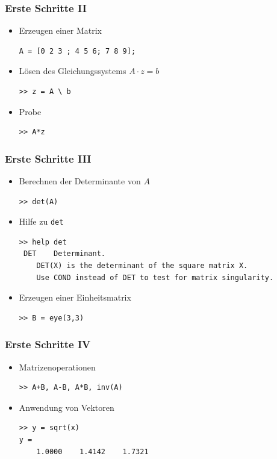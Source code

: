 \begin{frame}[fragile]\frametitle{Erste Schritte II}
\begin{itemize}
\item Erzeugen einer Matrix
\begin{lstlisting}
A = [0 2 3 ; 4 5 6; 7 8 9];
\end{lstlisting}
\item Lösen des Gleichungssystems $A \cdot z=b$
\begin{lstlisting}
>> z = A \ b
\end{lstlisting}
\item Probe 
\begin{lstlisting}
>> A*z
\end{lstlisting}
\end{itemize}
\end{frame}
\begin{frame}[fragile]\frametitle{Erste Schritte III}
\begin{itemize}
\item Berechnen der Determinante von $A$
\begin{lstlisting}
>> det(A)
\end{lstlisting}
\item Hilfe zu \lstinline!det! 
\begin{lstlisting}
>> help det
 DET    Determinant.
    DET(X) is the determinant of the square matrix X.
    Use COND instead of DET to test for matrix singularity.
\end{lstlisting}
\item Erzeugen einer Einheitsmatrix
\begin{lstlisting}
>> B = eye(3,3)
\end{lstlisting}
\end{itemize}
\end{frame}
\begin{frame}[fragile]\frametitle{Erste Schritte IV}
\begin{itemize}
\item Matrizenoperationen
\begin{lstlisting}
>> A+B, A-B, A*B, inv(A)
\end{lstlisting}
\item Anwendung von Vektoren
\begin{lstlisting}
>> y = sqrt(x)
y =
    1.0000    1.4142    1.7321
\end{lstlisting}
\end{itemize}
\end{frame}
